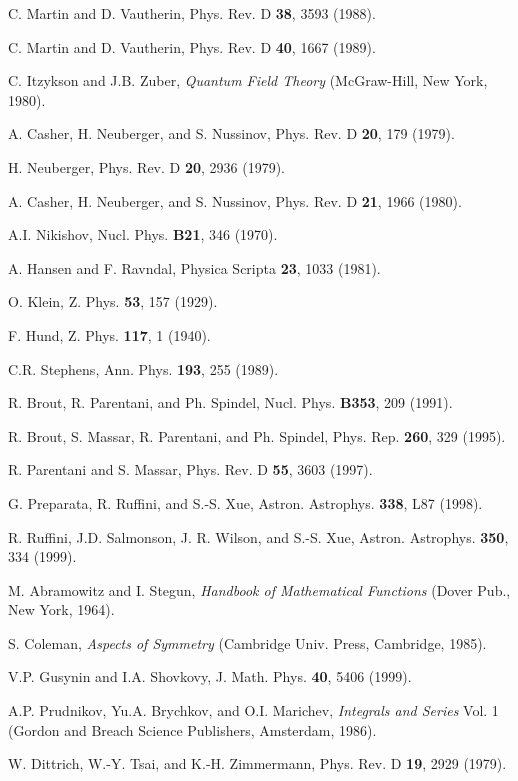 \documentclass[a4paper,prd,showpacs,preprintnumbers,amsmath,amssymb]{revtex4}
\begin{document}
\begin{references}
 C. Martin and D. Vautherin, Phys. Rev. D {\bf 38},
3593 (1988).

 C. Martin and D. Vautherin, Phys. Rev. D {\bf 40},
1667 (1989).

 C. Itzykson and J.B. Zuber, {\it Quantum Field
Theory} (McGraw-Hill, New York, 1980).

 A. Casher, H. Neuberger, and S. Nussinov,
Phys. Rev. D {\bf 20}, 179 (1979).

 H. Neuberger, Phys. Rev. D {\bf 20}, 2936 (1979).

 A. Casher, H. Neuberger, and S. Nussinov, Phys. Rev. D {\bf
21}, 1966 (1980).

 A.I. Nikishov, Nucl. Phys. {\bf B21}, 346
(1970).

 A. Hansen and F. Ravndal, Physica Scripta {\bf 23},
1033 (1981).

 O. Klein, Z. Phys. {\bf 53}, 157 (1929).

 F. Hund, Z. Phys. {\bf 117}, 1 (1940).

 C.R. Stephens, Ann. Phys. {\bf 193}, 255 (1989).

 R. Brout, R. Parentani, and Ph. Spindel, Nucl.
Phys. {\bf B353}, 209 (1991).

 R. Brout, S. Massar, R. Parentani, and Ph. Spindel, Phys. Rep.
{\bf 260}, 329 (1995).

 R. Parentani and S. Massar, Phys. Rev. D {\bf 55}, 3603
(1997).

 G. Preparata, R. Ruffini, and S.-S. Xue, Astron.
Astrophys. {\bf 338}, L87 (1998).

 R. Ruffini, J.D. Salmonson, J. R. Wilson, and S.-S. Xue,
Astron. Astrophys. {\bf 350}, 334 (1999).

 M. Abramowitz and I. Stegun, {\it Handbook of
Mathematical Functions} (Dover Pub., New York, 1964).

 S. Coleman, {\it Aspects of Symmetry} (Cambridge
Univ. Press, Cambridge, 1985).

 V.P. Gusynin and I.A. Shovkovy, J. Math. Phys.
{\bf 40}, 5406 (1999).

 A.P. Prudnikov, Yu.A. Brychkov, and O.I. Marichev,
{\it Integrals and Series} Vol. 1 (Gordon and Breach Science
Publishers, Amsterdam, 1986).

 W. Dittrich, W.-Y. Tsai, and K.-H. Zimmermann, Phys.
Rev. D {\bf 19}, 2929 (1979).


\end{references}
\end{document}
